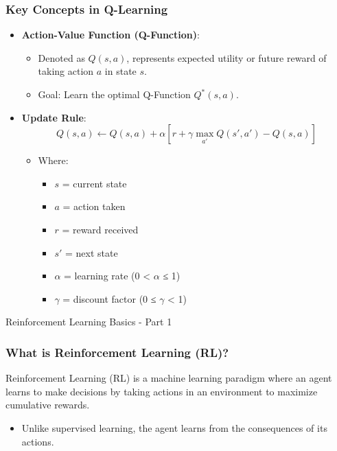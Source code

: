 \documentclass[aspectratio=169]{beamer}
\begin{document}
\begin{frame}[fragile]
    \frametitle{Key Concepts in Q-Learning}
    \begin{itemize}
        \item \textbf{Action-Value Function (Q-Function)}: 
            \begin{itemize}
                \item Denoted as \( Q(s, a) \), represents expected utility or future reward of taking action \( a \) in state \( s \).
                \item Goal: Learn the optimal Q-Function \( Q^*(s, a) \).
            \end{itemize}
        
        \item \textbf{Update Rule}:
            \begin{equation}
            Q(s, a) \leftarrow Q(s, a) + \alpha \left[ r + \gamma \max_{a'} Q(s', a') - Q(s, a) \right]
            \end{equation}
            \begin{itemize}
                \item Where:
                \begin{itemize}
                    \item \( s \) = current state
                    \item \( a \) = action taken
                    \item \( r \) = reward received
                    \item \( s' \) = next state
                    \item \( \alpha \) = learning rate (0 < \( \alpha \) ≤ 1)
                    \item \( \gamma \) = discount factor (0 ≤ \( \gamma \) < 1)
                \end{itemize}
            \end{itemize}
    \end{itemize}
\end{frame}

\begin{frame}[fragile]{Reinforcement Learning Basics - Part 1}
    \frametitle{What is Reinforcement Learning (RL)?}
    Reinforcement Learning (RL) is a machine learning paradigm where an agent learns to make decisions by taking actions in an environment to maximize cumulative rewards. 
    \begin{itemize}
        \item Unlike supervised learning, the agent learns from the consequences of its actions.
    \end{itemize}
\end{frame}
\end{document}
